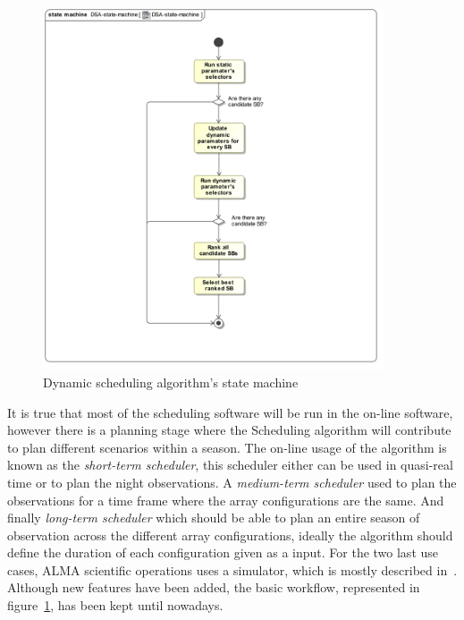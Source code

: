 \begin{figure}[htbp]	
\begin{center}
\includegraphics[width=0.9\textwidth]{images/DSA-state-machine}
\end{center}
\caption{Dynamic scheduling algorithm's state machine}
\label{fig:sched-dsa-state-machine}
\end{figure}

It is true that most of the scheduling software will be run in the on-line software, however there is a planning stage where the Scheduling algorithm will contribute to plan different scenarios within a season. The on-line usage of the algorithm is known as the \textit{short-term scheduler}, this scheduler either can be used in quasi-real time or to plan the night observations. A \textit{medium-term scheduler} used to plan the observations for a time frame where the array configurations are the same. And finally \textit{long-term scheduler} which should be able to plan an entire season of observation across the different array configurations, ideally the algorithm should define the duration of each configuration given as a input. For the two last use cases, ALMA scientific operations uses a simulator, which is mostly described in~\cite{hoffstadt10}. Although new features have been added, the basic workflow, represented in figure~\ref{fig:sched-dsa-state-machine}, has been kept until nowadays.